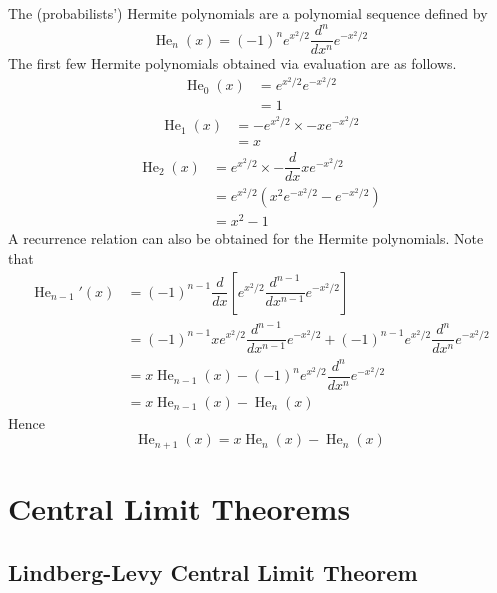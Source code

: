\documentclass[11pt]{report} %
\begin{document}
The (probabilists') Hermite polynomials are a polynomial sequence defined by
\begin{equation}
\operatorname{He}_{n}\left(x\right) = \left(-1\right)^{n}e^{x^{2}/2}\dfrac{d^{n}}{dx^{n}}e^{-x^{2}/2}
\end{equation}
The first few Hermite polynomials obtained via evaluation are as follows.
\begin{align}
\operatorname{He}_{0}\left(x\right) &= e^{x^{2}/2}e^{-x^{2}/2} \\
&= 1
\end{align}
\begin{align}
\operatorname{He}_{1}\left(x\right) &= -e^{x^{2}/2}\times -xe^{-x^{2}/2} \\
&= x
\end{align}
\begin{align}
\operatorname{He}_{2}\left(x\right) &= e^{x^{2}/2}\times -\dfrac{d}{dx}xe^{-x^{2}/2} \\
&= e^{x^{2}/2}\left(x^{2}e^{-x^{2}/2} - e^{-x^{2}/2}\right) \\
&= x^{2} - 1
\end{align}
A recurrence relation can also be obtained for the Hermite polynomials. Note that
\begin{align}
\operatorname{He}_{n - 1}'\left(x\right) &= \left(-1\right)^{n-1}\dfrac{d}{dx}\left[e^{x^{2}/2}\dfrac{d^{n-1}}{dx^{n-1}}e^{-x^{2}/2}\right] \\
&= \left(-1\right)^{n-1}xe^{x^{2}/2}\dfrac{d^{n-1}}{dx^{n-1}}e^{-x^{2}/2} + \left(-1\right)^{n-1}e^{x^{2}/2}\dfrac{d^{n}}{dx^{n}}e^{-x^{2}/2} \\
&= x\operatorname{He}_{n-1}\left(x\right) - \left(-1\right)^{n}e^{x^{2}/2}\dfrac{d^{n}}{dx^{n}}e^{-x^{2}/2} \\
&= x\operatorname{He}_{n-1}\left(x\right) - \operatorname{He}_{n}\left(x\right)
\end{align}
Hence
\begin{equation}
\operatorname{He}_{n + 1}\left(x\right) = x\operatorname{He}_{n}\left(x\right)
- \operatorname{He}_{n}\left(x\right)
\end{equation}

\section{Central Limit Theorems}

\subsection{Lindberg-Levy Central Limit Theorem \cite{Kallenberg1997}}
\end{document}
